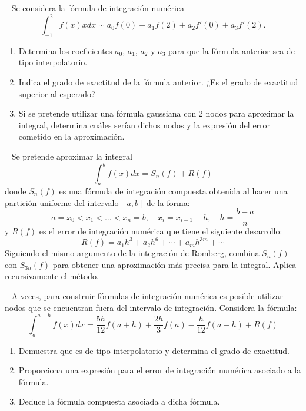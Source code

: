 \begin{ejercicio}~\label{ej:2.3.5}
    Se considera la fórmula de integración numérica
    \begin{equation*}
        \int_{-1}^{2} f(x)x dx \sim a_0 f(0) + a_1 f(2) + a_2 f'(0) + a_3f'(2).
    \end{equation*}
    \begin{enumerate}
        \item Determina los coeficientes $a_0$, $a_1$, $a_2$ y $a_3$ para que la fórmula anterior sea de tipo interpolatorio.
        \item Indica el grado de exactitud de la fórmula anterior. ¿Es el grado de exactitud superior al esperado?
        \item Si se pretende utilizar una fórmula gaussiana con 2 nodos para aproximar la integral, determina cuáles serían dichos nodos y la expresión del error cometido en la aproximación.
    \end{enumerate}
\end{ejercicio}

\begin{ejercicio}~\label{ej:2.3.6}
    Se pretende aproximar la integral
    \begin{equation*}
        \int_{a}^{b} f(x)dx = S_n(f) + R(f) \tag{1}
    \end{equation*}
    donde $S_n(f)$ es una fórmula de integración compuesta obtenida al hacer una partición uniforme del intervalo $[a, b]$ de la forma:
    \begin{equation*}
        a = x_0 < x_1 < \ldots < x_n = b, \quad x_i = x_{i-1} + h, \quad h = \frac{b - a}{n}
    \end{equation*}
    y $R(f)$ es el error de integración numérica que tiene el siguiente desarrollo:
    \begin{equation*}
        R(f) = a_1h^3 + a_2h^6 + \cdots + a_mh^{3m} + \cdots
    \end{equation*}
    Siguiendo el mismo argumento de la integración de Romberg, combina $S_n(f)$ con $S_{3n}(f)$ para obtener una aproximación más precisa para la integral. Aplica recursivamente el método.
\end{ejercicio}

\begin{ejercicio}~\label{ej:2.3.7}
    A veces, para construir fórmulas de integración numérica es posible utilizar nodos que se encuentran fuera del intervalo de integración. Considera la fórmula:
    \begin{equation*}
        \int_{a}^{a+h} f(x)dx = \frac{5h}{12}f(a + h) + \frac{2h}{3}f(a) - \frac{h}{12}f(a - h) + R(f)
    \end{equation*}
    \begin{enumerate}
        \item Demuestra que es de tipo interpolatorio y determina el grado de exactitud.
        \item Proporciona una expresión para el error de integración numérica asociado a la fórmula.
        \item Deduce la fórmula compuesta asociada a dicha fórmula.
    \end{enumerate}
\end{ejercicio}

